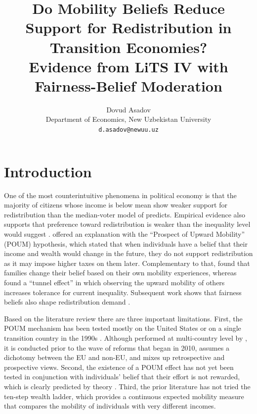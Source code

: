 \documentclass[11pt,a4paper]{article}
\title{\vspace{-1cm}\bfseries Do Mobility Beliefs Reduce Support for Redistribution in Transition Economies?\\Evidence from LiTS IV with Fairness-Belief Moderation}
\author{Dovud Asadov\\\small Department of Economics, New Uzbekistan University\\\small\texttt{d.asadov@newuu.uz}}
\date{}
\begin{document}
\maketitle

\section{Introduction}

One of the most counterintuitive phenomena in political economy is that the majority of
citizens whose income is below mean show weaker support for redistribution than the
median-voter model of \citet{meltzer1981rational} predicts. Empirical evidence also supports
that preference toward redistribution is weaker than the inequality level would suggest
\citep{hoy2021relatively, alesina2018intergenerational}. \citet{benabou2001social}
offered an explanation with the ``Prospect of Upward Mobility'' (POUM) hypothesis, which
stated that when individuals have a belief that their income and wealth would change in
the future, they do not support redistribution as it may impose higher taxes on them
later. Complementary to that, \citet{piketty1995social} found that families change their
belief based on their own mobility experiences, whereas \citet{hirschman1973changing}
found a ``tunnel effect'' in which observing the upward mobility of others increases
tolerance for current inequality. Subsequent work shows that fairness beliefs also shape
redistribution demand \citep{alesina2005fairness, benabou2006belief,
alesina2018intergenerational}.

Based on the literature review there are three important limitations. First, the POUM
mechanism has been tested mostly on the United States \citep{alesina2005preferences} or
on a single transition country in the 1990s \citep{ravallion2000wants}. Although
performed at multi-country level by \citet{cojocaru2014prospects}, it is conducted prior
to the wave of reforms that began in 2010, assumes a dichotomy between the EU and
non-EU, and mixes up retrospective and prospective views. Second, the existence of a
POUM effect has not yet been tested in conjunction with individuals' belief that their
effort is not rewarded, which is clearly predicted by theory \citep{alesina2005fairness,
benabou2006belief}. Third, the prior literature has not tried the ten-step wealth
ladder, which provides a continuous expected mobility measure that compares the mobility
of individuals with very different incomes.
\end{document}
